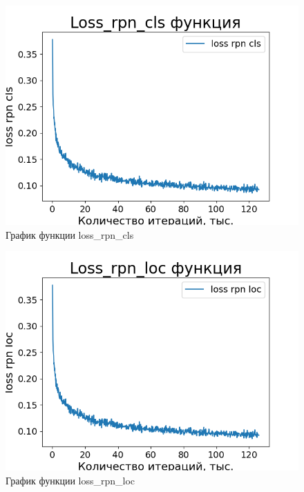 \begin{figure}[ht!] 
	\center
	\includegraphics [scale=0.8] {my_folder/images/loss_rpn_cls_second}
	\caption{График функции loss\_rpn\_cls}
	\label{fig:loss_rpn_cls}
\end{figure}

\begin{figure}[ht!] 
	\center
	\includegraphics [scale=0.8] {my_folder/images/loss_rpn_loc_second}
	\caption{График функции loss\_rpn\_loc}
	\label{fig:loss_rpn_loc}
\end{figure}

